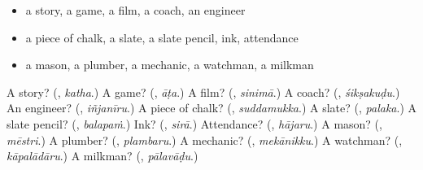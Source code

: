 \begin{itemize}
\raggedright
  \item a story, a game, a film, a coach, an engineer
  \item a piece of chalk, a slate, a slate pencil, ink, attendance
  \item a mason, a plumber, a mechanic, a watchman, a milkman
\end{itemize}

\begin{tcolorbox}[breakable,colback=teal!4,colframe=teal!35!black,title={Before you move on}]
A story? (\textbf{}, \emph{katha}.) A game? (\textbf{}, \emph{āṭa}.) A film? (\textbf{}, \emph{sinimā}.) A coach? (\textbf{}, \emph{śikṣakuḍu}.) An engineer? (\textbf{}, \emph{iñjanīru}.) A piece of chalk? (\textbf{}, \emph{suddamukka}.) A slate? (\textbf{}, \emph{palaka}.) A slate pencil? (\textbf{}, \emph{balapaṁ}.) Ink? (\textbf{}, \emph{sirā}.) Attendance? (\textbf{}, \emph{hājaru}.) A mason? (\textbf{}, \emph{mēstri}.) A plumber? (\textbf{}, \emph{plambaru}.) A mechanic? (\textbf{}, \emph{mekānikku}.) A watchman? (\textbf{}, \emph{kāpalādāru}.) A milkman? (\textbf{}, \emph{pālavāḍu}.)
\end{tcolorbox}
